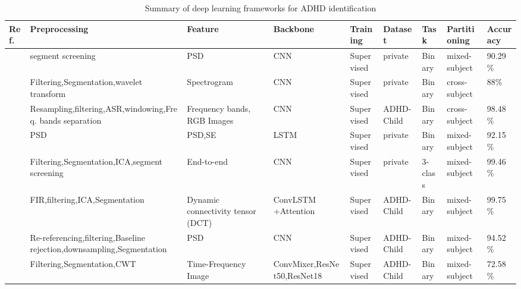 \begin{table*}[ht]
\renewcommand{\arraystretch}{1.2}
\caption{Summary of deep learning frameworks for ADHD identification}
\label{tab:adhds}
\footnotesize
\begin{tabular}{p{0.4cm}p{2.8cm}p{2cm}p{1.5cm}p{1.9cm}p{1.9cm}p{0.8cm}p{1.8cm}p{1.5cm}}
\hline
\textbf{Ref.} & \textbf{Preprocessing} & \textbf{Feature} & \textbf{Backbone} & \textbf{Training} & \textbf{Dataset} & \textbf{Task} & \textbf{Partitioning} &
\textbf{Accuracy} \\
\hline
~\cite{chen2019use} & segment screening & PSD & CNN & Supervised & private & Binary & mixed-subject & 90.29\% \\
~\cite{dubreuil2020deep} & Filtering,Segmentation,\newline wavelet transform & Spectrogram & CNN & Supervised & private & Binary & cross-subject & 88\% \\
~\cite{MOGHADDARI2020105738} & Resampling,filtering,\newline ASR,windowing,\newline Freq. bands separation & Frequency bands, RGB Images & CNN & Supervised & ADHD-Child & Binary & cross-subject & 98.48\% \\
~\cite{tosun2021effects} & PSD & PSD,SE & LSTM & Supervised & private & Binary & mixed-subject & 92.15\% \\
~\cite{ADHD5} & Filtering,Segmentation,\newline ICA,segment screening & End-to-end & CNN & Supervised & private & 3-class & mixed-subject & 99.46\% \\
~\cite{ADHD6} & FIR,filtering,ICA,\newline Segmentation & Dynamic connectivity tensor (DCT) & ConvLSTM +Attention & Supervised & ADHD-Child & Binary & mixed-subject & 99.75\% \\
~\cite{nouri2024detection} & Re-referencing,filtering,\newline Baseline rejection,\newline downsampling,Segmentation & PSD & CNN & Supervised & ADHD-Child & Binary & mixed-subject & 94.52\% \\
~\cite{ADHD8} & Filtering,Segmentation,\newline CWT & Time-Frequency Image & ConvMixer,\newline ResNet50,\newline ResNet18 & Supervised & ADHD-Child & Binary & mixed-subject & 72.58\% \\
\hline
\end{tabular}
\end{table*}